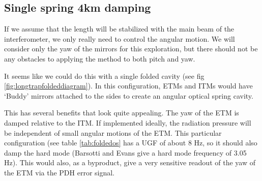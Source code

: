 %
%
%
%
\subsection{Single spring 4km damping}

If we assume that the length will be stabilized with the main beam of the interferometer, we only really need to control the angular motion. We will consider only the yaw of the mirrors for this exploration, but there should not be any obstacles to applying the method to both pitch and yaw. 

It seems like we could do this with a single folded cavity (see fig \ref{fig:longtrapfoldeddiagram}). In this configuration, ETMs and ITMs would have `Buddy' mirrors attached to the sides to create an angular optical spring cavity.

This has several benefits that look quite appealing. The yaw of the ETM is damped relative to the ITM. If implemented ideally, the radiation pressure will be independent of small angular motions of the ETM. This particular configuration (see table \ref{tab:foldedos} has a UGF of about 8 Hz, so it should also damp the hard mode (Barsotti and Evans give a hard mode frequency of 3.05 Hz). This would also, as a byproduct, give a very sensitive readout of the yaw of the ETM via the PDH error signal.

